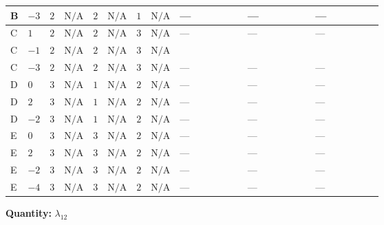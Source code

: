 \documentclass[8pt]{article}
\begin{document}
\begin{landscape}
\begin{longtable}{@{}llcccccc >{\raggedright\arraybackslash}p{0.21\linewidth} >{\raggedright\arraybackslash}p{0.21\linewidth} >{\raggedright\arraybackslash}p{0.21\linewidth}@{}}
\midrule
B & $-3$ & $2$ & $\text{N/A}$ & $2$ & $\text{N/A}$ & $1$ & $\text{N/A}$ & --- & --- & --- \\
\midrule
C & $1$ & $2$ & $\text{N/A}$ & $2$ & $\text{N/A}$ & $3$ & $\text{N/A}$ & --- & --- & --- \\
\midrule
C & $-1$ & $2$ & $\text{N/A}$ & $2$ & $\text{N/A}$ & $3$ & $\text{N/A}$ & \scriptsize\adjustbox{max width=\linewidth}{$\begin{gathered} -3 {g_1}^2 {\lambda_{H H^\dagger S_1^\dagger S_2^\dagger}^{\rm Cross}}\end{gathered}$} & \scriptsize\adjustbox{max width=\linewidth}{$\begin{gathered} +2 {\lambda_{12}^{(1)}} {\lambda_{H H^\dagger S_1^\dagger S_2^\dagger}^{\rm Cross}}\end{gathered}$} & \scriptsize\adjustbox{max width=\linewidth}{$\begin{gathered} +{\lambda_{12}^{(A)}} \left({\lambda_{X_{17}}^{(1)}}-\frac{{\lambda_{H H^\dagger S_1^\dagger S_2^\dagger}^{\rm Cross}}}{2}\right)\end{gathered}$} \\
\midrule
C & $-3$ & $2$ & $\text{N/A}$ & $2$ & $\text{N/A}$ & $3$ & $\text{N/A}$ & --- & --- & --- \\
\midrule
D & $0$ & $3$ & $\text{N/A}$ & $1$ & $\text{N/A}$ & $2$ & $\text{N/A}$ & --- & --- & --- \\
\midrule
D & $2$ & $3$ & $\text{N/A}$ & $1$ & $\text{N/A}$ & $2$ & $\text{N/A}$ & --- & --- & --- \\
\midrule
D & $-2$ & $3$ & $\text{N/A}$ & $1$ & $\text{N/A}$ & $2$ & $\text{N/A}$ & --- & --- & --- \\
\midrule
E & $0$ & $3$ & $\text{N/A}$ & $3$ & $\text{N/A}$ & $2$ & $\text{N/A}$ & --- & --- & --- \\
\midrule
E & $2$ & $3$ & $\text{N/A}$ & $3$ & $\text{N/A}$ & $2$ & $\text{N/A}$ & --- & --- & --- \\
\midrule
E & $-2$ & $3$ & $\text{N/A}$ & $3$ & $\text{N/A}$ & $2$ & $\text{N/A}$ & --- & --- & --- \\
\midrule
E & $-4$ & $3$ & $\text{N/A}$ & $3$ & $\text{N/A}$ & $2$ & $\text{N/A}$ & --- & --- & --- \\
\midrule
\bottomrule
\end{longtable}
\clearpage
\noindent\textbf{Quantity: }$\lambda_{12}$\par\smallskip

\end{landscape}
\end{document}
